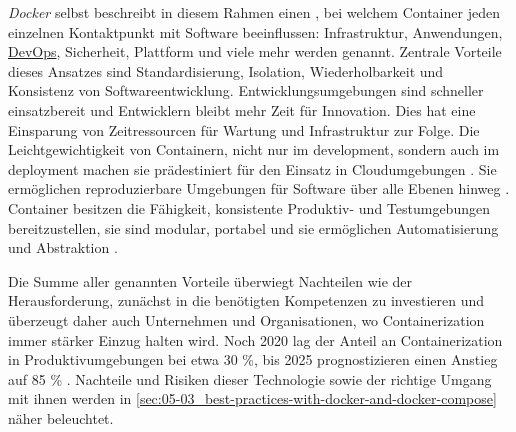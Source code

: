 \textit{Docker} selbst beschreibt in diesem Rahmen einen , bei welchem Container jeden einzelnen Kontaktpunkt mit Software beeinflussen: Infrastruktur, Anwendungen, \hyperref[sec:03-01_devops]{DevOps}, Sicherheit, Plattform und viele mehr werden genannt. Zentrale Vorteile dieses Ansatzes sind Standardisierung, Isolation, Wiederholbarkeit und Konsistenz von Softwareentwicklung. Entwicklungsumgebungen sind schneller einsatzbereit und Entwicklern bleibt mehr Zeit für Innovation. Dies hat eine Einsparung von Zeitressourcen für Wartung und Infrastruktur zur Folge. \cite{016:Effectively-managing-all-of-those-Applications} Die Leichtgewichtigkeit von Containern, nicht nur im \Gls{development}, sondern auch im \Gls{deployment} machen sie prädestiniert für den Einsatz in Cloudumgebungen \cite{015:Containers-in-Software-Development,024:Investiugating-Impact-of-Containerization-on-Deployment-Process-in-DevOps,025:Exploring-Solutions-for-Container-Image-Security}. Sie ermöglichen reproduzierbare Umgebungen für Software über alle Ebenen hinweg \cite{013:Role-of-Containers-in-Reproducibility,024:Investiugating-Impact-of-Containerization-on-Deployment-Process-in-DevOps}. Container besitzen die Fähigkeit, konsistente Produktiv- und Testumgebungen bereitzustellen, sie sind modular, portabel und sie ermöglichen Automatisierung und Abstraktion \cite{014:Managing-Container-based-Software-Development-Environments}.

Die Summe aller genannten Vorteile überwiegt Nachteilen wie der Herausforderung, zunächst in die benötigten Kompetenzen zu investieren und überzeugt daher auch Unternehmen und Organisationen, wo Containerization immer stärker Einzug halten wird. Noch 2020 lag der Anteil an Containerization in Produktivumgebungen bei etwa 30 \%, bis 2025 prognostizieren \citeauthor{020:Assessing-and-Improving-Quality-of-Docker-Artifacts} einen Anstieg auf 85 \% \cite{020:Assessing-and-Improving-Quality-of-Docker-Artifacts}. Nachteile und Risiken dieser Technologie sowie der richtige Umgang mit ihnen werden in \autoref{sec:05-03_best-practices-with-docker-and-docker-compose} näher beleuchtet.
